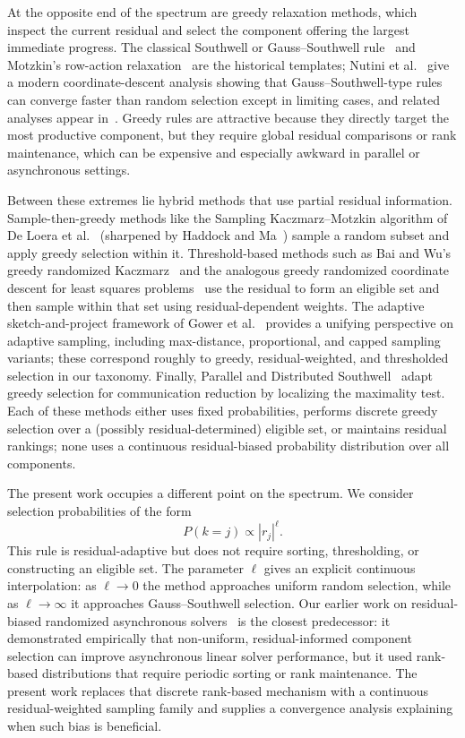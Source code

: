 \documentclass[pdflatex,sn-mathphys-num]{sn-jnl}%
\theoremstyle{thmstyleone}%
\theoremstyle{thmstyletwo}%
\theoremstyle{thmstylethree}%
\begin{document}
At the opposite end of the spectrum are greedy relaxation methods, which
inspect the current residual and select the component offering the largest
immediate progress. The classical Southwell or Gauss--Southwell
rule~\cite{southwell1946relaxation} and Motzkin's row-action
relaxation~\cite{agmon1954relaxation,motzkin1954relaxation} are the
historical templates; Nutini et al.~\cite{nutini2015coordinate} give a
modern coordinate-descent analysis showing that Gauss--Southwell-type
rules can converge faster than random selection except in limiting cases,
and related analyses appear in~\cite{griebel2012greedy,frommer2023convergence}.
Greedy rules are attractive because they directly target the most productive
component, but they require global residual comparisons or rank maintenance,
which can be expensive and especially awkward in parallel or asynchronous
settings.

Between these extremes lie hybrid methods that use partial residual
information. Sample-then-greedy methods like the Sampling Kaczmarz--Motzkin
algorithm of De Loera et al.~\cite{deloera2017sampling} (sharpened
by Haddock and Ma~\cite{haddock2021greed}) sample a random subset and apply
greedy selection within it. Threshold-based methods such as Bai and Wu's
greedy randomized Kaczmarz~\cite{bai2018greedyk,bai2018relaxed} and the
analogous greedy randomized coordinate descent for least squares
problems~\cite{bai2019greedy} use the residual to form an eligible set
and then sample within that set using residual-dependent weights. The
adaptive sketch-and-project framework of Gower et
al.~\cite{gower2021adaptive} provides a unifying perspective on adaptive
sampling, including max-distance, proportional, and capped sampling
variants; these correspond roughly to greedy, residual-weighted, and
thresholded selection in our taxonomy. Finally, Parallel and Distributed
Southwell~\cite{wolfsonpou2016reducing,wolfsonpou2017distributed} adapt
greedy selection for communication reduction by localizing the maximality
test. Each of these methods either uses fixed probabilities, performs
discrete greedy selection over a (possibly residual-determined) eligible
set, or maintains residual rankings; none uses a continuous residual-biased
probability distribution over all components.

The present work occupies a different point on the spectrum.  We consider
selection probabilities of the form
\[
    P(k=j) \propto |r_j|^\ell.
\]
This rule is residual-adaptive but does not require sorting, thresholding,
or constructing an eligible set.  The parameter
$\ell$ gives an explicit continuous interpolation: as $\ell \to 0$ the method
approaches uniform random selection, while as $\ell \to \infty$ it approaches
Gauss--Southwell selection. Our earlier work on residual-biased randomized
asynchronous solvers~\cite{coleman2019enhancing} is the closest predecessor:
it demonstrated empirically that non-uniform, residual-informed component
selection can improve asynchronous linear solver performance, but it used
rank-based distributions that require periodic sorting or rank maintenance.
The present work replaces that discrete rank-based mechanism with a
continuous residual-weighted sampling family and supplies a convergence
analysis explaining when such bias is beneficial.
\end{document}
